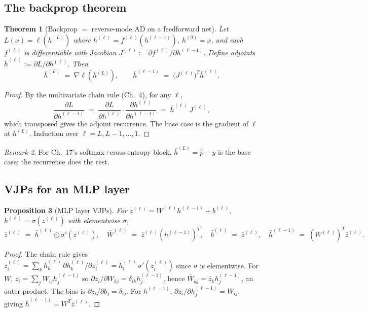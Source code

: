 \documentclass[11pt]{article}
\newtheorem{theorem}{Theorem}[section]
\newtheorem{proposition}[theorem]{Proposition}
\theoremstyle{remark}
\newtheorem{remark}[theorem]{Remark}
\begin{document}
\subsection*{The backprop theorem}

\begin{theorem}[Backprop $=$ reverse-mode AD on a feedforward net]
Let $L(x)=\ell(h^{(L)})$ where $h^{(\ell)}=f^{(\ell)}(h^{(\ell-1)})$,
$h^{(0)}=x$, and each $f^{(\ell)}$ is differentiable with Jacobian
$J^{(\ell)} := \partial f^{(\ell)}/\partial h^{(\ell-1)}$. Define adjoints
$\bar h^{(\ell)} := \partial L/\partial h^{(\ell)}$. Then
\[
  \bar h^{(L)} \;=\; \nabla\ell(h^{(L)}),
  \qquad
  \bar h^{(\ell-1)} \;=\; \bigl(J^{(\ell)}\bigr)^{T} \bar h^{(\ell)}.
\]
\end{theorem}

\begin{proof}
By the multivariate chain rule (Ch.~4), for any $\ell$,
\[
  \frac{\partial L}{\partial h^{(\ell-1)}}
  \;=\; \frac{\partial L}{\partial h^{(\ell)}}\cdot\frac{\partial h^{(\ell)}}{\partial h^{(\ell-1)}}
  \;=\; \bar h^{(\ell)}\,J^{(\ell)},
\]
which transposed gives the adjoint recurrence. The base case is the gradient
of $\ell$ at $h^{(L)}$. Induction over $\ell=L,L-1,\dots,1$.
\end{proof}

\begin{remark}
For Ch.~17's softmax+cross-entropy block, $\bar h^{(L)}=\hat p-y$ is the base
case; the recurrence does the rest.
\end{remark}

\subsection*{VJPs for an MLP layer}

\begin{proposition}[MLP layer VJPs]
For $z^{(\ell)}=W^{(\ell)}h^{(\ell-1)}+b^{(\ell)}$, $h^{(\ell)}=\sigma(z^{(\ell)})$
with elementwise $\sigma$,
\[
  \bar z^{(\ell)} \;=\; \bar h^{(\ell)} \odot \sigma'(z^{(\ell)}),
\quad
  \bar W^{(\ell)} \;=\; \bar z^{(\ell)} (h^{(\ell-1)})^{T},
\quad
  \bar b^{(\ell)} \;=\; \bar z^{(\ell)},
\quad
  \bar h^{(\ell-1)} \;=\; (W^{(\ell)})^{T}\bar z^{(\ell)}.
\]
\end{proposition}

\begin{proof}
The chain rule gives
$\bar z^{(\ell)}_i = \sum_k \bar h^{(\ell)}_k\,\partial h^{(\ell)}_k/\partial z^{(\ell)}_i
 = \bar h^{(\ell)}_i\,\sigma'(z^{(\ell)}_i)$
since $\sigma$ is elementwise. For $W$, $z_i = \sum_j W_{ij} h^{(\ell-1)}_j$ so
$\partial z_i/\partial W_{kj}=\delta_{ik}h^{(\ell-1)}_j$, hence
$\bar W_{kj}=\bar z_k h^{(\ell-1)}_j$, an outer product. The bias is
$\partial z_i/\partial b_j=\delta_{ij}$. For $h^{(\ell-1)}$,
$\partial z_i/\partial h^{(\ell-1)}_j=W_{ij}$, giving
$\bar h^{(\ell-1)}=W^{T}\bar z^{(\ell)}$.
\end{proof}
\end{document}

